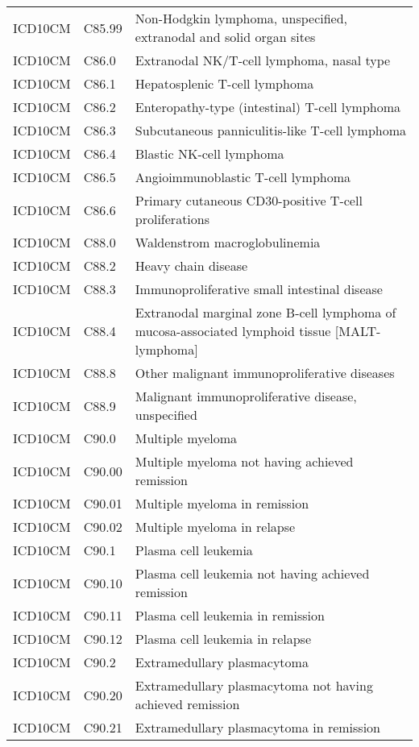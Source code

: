 \begin{longtable}{p{}p{}p{}}
  ICD10CM & C85.99 & Non-Hodgkin lymphoma, unspecified, extranodal and solid organ sites \\ 
  ICD10CM & C86.0 & Extranodal NK/T-cell lymphoma, nasal type \\ 
  ICD10CM & C86.1 & Hepatosplenic T-cell lymphoma \\ 
  ICD10CM & C86.2 & Enteropathy-type (intestinal) T-cell lymphoma \\ 
  ICD10CM & C86.3 & Subcutaneous panniculitis-like T-cell lymphoma \\ 
  ICD10CM & C86.4 & Blastic NK-cell lymphoma \\ 
  ICD10CM & C86.5 & Angioimmunoblastic T-cell lymphoma \\ 
  ICD10CM & C86.6 & Primary cutaneous CD30-positive T-cell proliferations \\ 
  ICD10CM & C88.0 & Waldenstrom macroglobulinemia \\ 
  ICD10CM & C88.2 & Heavy chain disease \\ 
  ICD10CM & C88.3 & Immunoproliferative small intestinal disease \\ 
  ICD10CM & C88.4 & Extranodal marginal zone B-cell lymphoma of mucosa-associated lymphoid tissue [MALT-lymphoma] \\ 
  ICD10CM & C88.8 & Other malignant immunoproliferative diseases \\ 
  ICD10CM & C88.9 & Malignant immunoproliferative disease, unspecified \\ 
  ICD10CM & C90.0 & Multiple myeloma \\ 
  ICD10CM & C90.00 & Multiple myeloma not having achieved remission \\ 
  ICD10CM & C90.01 & Multiple myeloma in remission \\ 
  ICD10CM & C90.02 & Multiple myeloma in relapse \\ 
  ICD10CM & C90.1 & Plasma cell leukemia \\ 
  ICD10CM & C90.10 & Plasma cell leukemia not having achieved remission \\ 
  ICD10CM & C90.11 & Plasma cell leukemia in remission \\ 
  ICD10CM & C90.12 & Plasma cell leukemia in relapse \\ 
  ICD10CM & C90.2 & Extramedullary plasmacytoma \\ 
  ICD10CM & C90.20 & Extramedullary plasmacytoma not having achieved remission \\ 
  ICD10CM & C90.21 & Extramedullary plasmacytoma in remission \\ 

\end{longtable}
